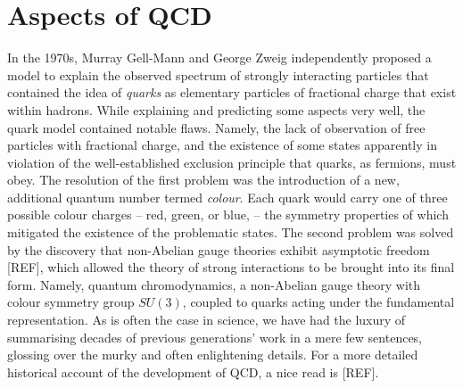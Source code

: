 \documentclass[12pt, a4paper, twoside]{book}
\newcommand{\brac}[1] {\!\left(#1\right)}
\begin{document}
\section{Aspects of QCD}
In the 1970s, Murray Gell-Mann and George Zweig independently proposed a model to explain the observed spectrum of strongly interacting particles that contained the idea of \emph{quarks} as elementary particles of fractional charge that exist within hadrons. While explaining and predicting some aspects very well, the quark model contained notable flaws. Namely, the lack of observation of free particles with fractional charge, and the existence of some states apparently in violation of the well-established exclusion principle that quarks, as fermions, must obey. The resolution of the first problem was the introduction of a new, additional quantum number termed \emph{colour}. Each quark would carry one of three possible colour charges -- red, green, or blue, -- the symmetry properties of which mitigated the existence of the problematic states. The second problem was solved by the discovery that non-Abelian gauge theories exhibit asymptotic freedom [REF], which allowed the theory of strong interactions to be brought into its final form. Namely, quantum chromodynamics, a non-Abelian gauge theory with colour symmetry group \(SU\brac{3}\), coupled to quarks acting under the fundamental representation. As is often the case in science, we have had the luxury of summarising decades of previous generations' work in a mere few sentences, glossing over the murky and often enlightening details. For a more detailed historical account of the development of QCD, a nice read is [REF].  
\end{document}
